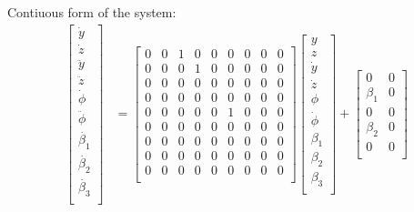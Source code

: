 \documentclass[12pt]{article}
\begin{document}
Contiuous form of the system:
\begin{align*}
    \begin{bmatrix}
        \dot{y} \\
        \dot{z} \\
        \ddot{y} \\
        \ddot{z} \\
        \dot{\phi} \\
        \ddot{\phi} \\
        \dot{\beta_1} \\
        \dot{\beta_2} \\
        \dot{\beta_3} \\
    \end{bmatrix} &=
    \begin{bmatrix}
        0 & 0 & 1 & 0 & 0 & 0 & 0 & 0 & 0 \\
        0 & 0 & 0 & 1 & 0 & 0 & 0 & 0 & 0 \\
        0 & 0 & 0 & 0 & 0 & 0 & 0 & 0 & 0 \\
        0 & 0 & 0 & 0 & 0 & 0 & 0 & 0 & 0 \\
        0 & 0 & 0 & 0 & 0 & 1 & 0 & 0 & 0 \\
        0 & 0 & 0 & 0 & 0 & 0 & 0 & 0 & 0 \\
        0 & 0 & 0 & 0 & 0 & 0 & 0 & 0 & 0 \\
        0 & 0 & 0 & 0 & 0 & 0 & 0 & 0 & 0 \\
        0 & 0 & 0 & 0 & 0 & 0 & 0 & 0 & 0 \\
    \end{bmatrix}
    \begin{bmatrix}
        y \\
        z \\
        \dot{y} \\
        \dot{z} \\
        \phi \\
        \dot{\phi} \\
        \beta_1 \\
        \beta_2 \\
        \beta_3 \\
    \end{bmatrix} +
    \begin{bmatrix}
        0 & 0 \\
        \beta_1 & 0 \\
        0 & 0 \\
        \beta_2 & 0 \\
        0 & 0 \\

\end{bmatrix}
\end{align*}
\end{document}
